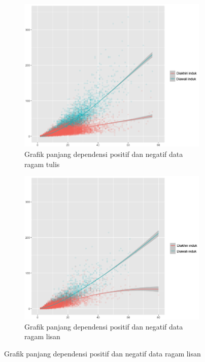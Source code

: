 \begin{figure}
\centering

\begin{subfigure}{.7\linewidth}
  \centering
  \includegraphics[width=1\linewidth] {pics/tulis_DLposneg.png} 
	\caption{Grafik panjang dependensi positif dan negatif data ragam tulis}
	\label{fig:tulis_DLposneg} 
\end{subfigure}
%
\begin{subfigure}{.7\linewidth}
  \centering
  \includegraphics[width=1\linewidth]{pics/lisan_DLposneg.png} 
	\caption{Grafik panjang dependensi positif dan negatif data ragam lisan}
	\label{fig:lisan_DLposneg} 
\end{subfigure}


\end{figure}

